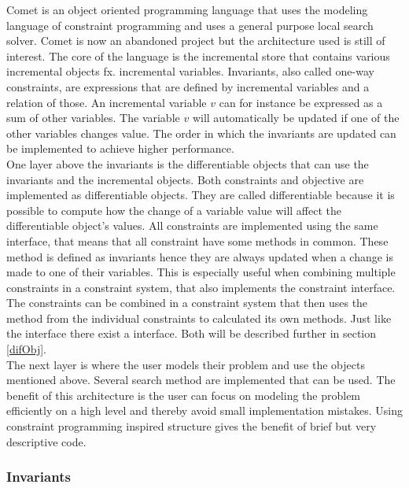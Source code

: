 

Comet is an object oriented programming language that uses the modeling language of constraint programming and uses a 
general purpose local search solver. Comet is now an abandoned project but the architecture used is still of interest. 
The core of the language is the incremental store that contains various incremental objects fx. incremental variables. 
Invariants, also called one-way constraints, are expressions that are defined by incremental variables and a relation of 
those. An incremental variable $v$ can for instance be expressed as a sum of other variables. The variable $v$ will 
automatically be updated if one of the other variables changes value. The order in which the invariants are updated can 
be implemented to achieve higher performance.  \medskip \\
One layer above the invariants is the differentiable objects that can use the invariants and the incremental objects. 
Both constraints and objective are implemented as differentiable objects. They are called differentiable 
because it is possible to compute how the change of a variable value will affect the differentiable object's values. 
All constraints are implemented using the same interface, that means that all constraint have some methods in common. 
These method is defined as invariants hence they are always updated when a change is made to one of their variables. 
This is especially useful when combining multiple constraints in a constraint system, that also implements the 
constraint interface. The constraints can be combined in a constraint system that then uses the method from the 
individual constraints to calculated its own methods. Just like the  interface there exist a 
 interface. Both will be described further in section \ref{difObj}. \medskip \\ 
The next layer is where the user models their problem and use the objects mentioned above. Several search method are 
implemented that can be used. The benefit of this architecture is the user can focus on modeling the problem 
efficiently on a high level and thereby avoid small implementation mistakes. Using constraint programming inspired 
structure gives the benefit of brief but very descriptive code.

\subsubsection{Invariants}



